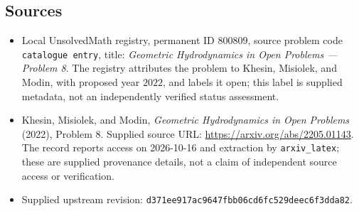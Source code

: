 \documentclass[11pt]{article}
\begin{document}
\subsection{Sources}
\begin{itemize}
\item Local UnsolvedMath registry, permanent ID \(800809\), source problem code \texttt{catalogue entry}, title: \emph{Geometric Hydrodynamics in Open Problems --- Problem 8}. The registry attributes the problem to Khesin, Misiolek, and Modin, with proposed year \(2022\), and labels it open; this label is supplied metadata, not an independently verified status assessment.
\item Khesin, Misiolek, and Modin, \emph{Geometric Hydrodynamics in Open Problems} (2022), Problem 8. Supplied source URL: \url{https://arxiv.org/abs/2205.01143}. The record reports access on 2026-10-16 and extraction by \texttt{arxiv\_latex}; these are supplied provenance details, not a claim of independent source access or verification.
\item Supplied upstream revision: \texttt{d371ee917ac9647fbb06cd6fc529deec6f3dda82}.
\end{itemize}
\end{document}
